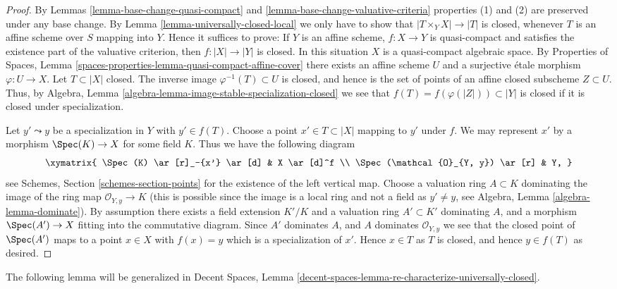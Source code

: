 \begin{proof}
By Lemmas \ref{lemma-base-change-quasi-compact}
and \ref{lemma-base-change-valuative-criteria}
properties (1) and (2) are preserved under
any base change. By Lemma \ref{lemma-universally-closed-local}
we only have to show that $|T \times_Y X| \to |T|$ is closed,
whenever $T$ is an affine scheme over $S$ mapping into $Y$. Hence it
suffices to prove: If $Y$ is an affine scheme, $f : X \to Y$ is quasi-compact
and satisfies the existence part of the valuative criterion, then
$f : |X| \to |Y|$ is closed. In this situation $X$ is a quasi-compact
algebraic space. By
Properties of Spaces,
Lemma \ref{spaces-properties-lemma-quasi-compact-affine-cover}
there exists an affine scheme $U$ and a surjective \'etale morphism
$\varphi : U \to X$. Let $T \subset |X|$ closed. The inverse image
$\varphi^{-1}(T) \subset U$ is closed, and hence is the set of points
of an affine closed subscheme $Z \subset U$. Thus, by
Algebra, Lemma \ref{algebra-lemma-image-stable-specialization-closed}
we see that $f(T) = f(\varphi(|Z|)) \subset |Y|$ is closed if it is
closed under specialization.

\medskip\noindent
Let $y' \leadsto y$ be a specialization in $Y$ with $y' \in f(T)$.
Choose a point $x' \in T \subset |X|$ mapping to $y'$ under $f$.
We may represent $x'$ by a morphism $\Spec(K) \to X$
for some field $K$. Thus we have the following diagram
$$
\xymatrix{
\Spec(K) \ar[r]_-{x'} \ar[d] & X \ar[d]^f \\
\Spec(\mathcal{O}_{Y, y}) \ar[r] & Y,
}
$$
see
Schemes, Section \ref{schemes-section-points}
for the existence of the left vertical map.
Choose a valuation ring $A \subset K$ dominating the image of
the ring map $\mathcal{O}_{Y, y} \to K$ (this is possible since
the image is a local ring and not a field as $y' \not = y$, see
Algebra, Lemma \ref{algebra-lemma-dominate}).
By assumption there exists a field extension $K'/K$ and a
valuation ring $A' \subset K'$ dominating $A$, and a morphism
$\Spec(A') \to X$ fitting into the commutative diagram.
Since $A'$ dominates $A$, and $A$ dominates $\mathcal{O}_{Y, y}$
we see that the closed point of $\Spec(A')$ maps to
a point $x \in X$ with $f(x) = y$ which is a specialization of $x'$.
Hence $x \in T$ as $T$ is closed, and hence $y \in f(T)$ as desired.
\end{proof}

\noindent
The following lemma will be generalized in Decent Spaces, Lemma
\ref{decent-spaces-lemma-re-characterize-universally-closed}.

